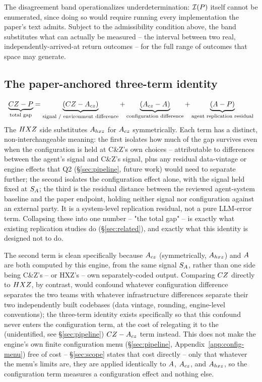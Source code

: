 The disagreement band operationalizes underdetermination: $\mathcal{I}(P)$
itself cannot be enumerated, since doing so would require running every
implementation the paper's text admits. Subject to the admissibility condition
above, the band substitutes what can actually be measured -- the interval
between two real, independently-arrived-at return outcomes -- for the full
range of outcomes that space may generate.

\subsection{The paper-anchored three-term identity}
\begin{equation}
  \label{eq:three-term}
  \underbrace{CZ - P}_{\text{total gap}}
  = \underbrace{(CZ - A_{cz})}_{\text{signal / environment difference}}
  + \underbrace{(A_{cz} - A)}_{\text{configuration difference}}
  + \underbrace{(A - P)}_{\text{agent replication residual}}
\end{equation}
The $HXZ$ side substitutes $A_{hxz}$ for $A_{cz}$ symmetrically. Each term has
a distinct, non-interchangeable meaning: the first isolates how much of the
gap survives even when the configuration is held at C\&Z's own choices --
attributable to differences between the agent's signal and C\&Z's signal,
plus any residual data-vintage or engine effects that Q2 (\S\ref{sec:pipeline},
future work) would need to separate further; the second isolates the
configuration effect alone, with the signal held fixed at $S_A$; the third
is the residual distance between the reviewed agent-system baseline and the
paper endpoint, holding neither signal nor configuration against an external
party. It is a system-level replication residual, not a pure LLM-error term.
Collapsing these into one number
-- "the total gap" -- is exactly what existing replication studies do
(\S\ref{sec:related}), and exactly what this identity is designed not to do.

The second term is clean specifically because $A_{cz}$ (symmetrically,
$A_{hxz}$) and $A$ are both computed by this engine, from the same
signal $S_A$, rather than one side being C\&Z's -- or HXZ's -- own
separately-coded output. Comparing $CZ$ directly to $HXZ$, by contrast,
would confound whatever configuration difference separates the two teams
with whatever infrastructure differences separate their two independently
built codebases (data vintage, rounding, engine-level conventions); the
three-term identity exists specifically so that this confound never enters
the configuration term, at the cost of relegating it to the (unidentified,
see \S\ref{sec:pipeline}) $CZ - A_{cz}$ term instead. This does not make the
engine's own finite configuration menu (\S\ref{sec:pipeline},
Appendix~\ref{app:config-menu}) free of cost -- \S\ref{sec:scope} states
that cost directly -- only that whatever the menu's limits are, they are
applied identically to $A$, $A_{cz}$, and $A_{hxz}$, so the configuration
term measures a configuration effect and nothing else.

